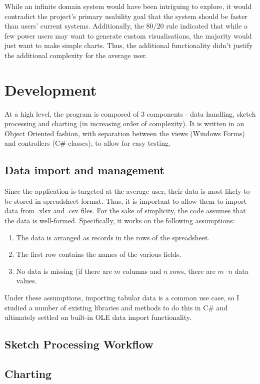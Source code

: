 	While an infinite domain system would have been intriguing to explore, it would contradict the project's primary usability goal that the system should be faster than users' current systems. Additionally, the 80/20 rule indicated that while a few power users may want to generate custom visualisations, the majority would just want to make simple charts. Thus, the additional functionality didn't justify the additional complexity for the average user.
	


	\section{Development}
		At a high level, the program is composed of 3 components - data handling, sketch processing and charting (in increasing order of complexity). It is written in an Object Oriented fashion, with separation between the views (Windows Forms) and controllers (C\# classes), to allow for easy testing.
	\subsection{Data import and management}
		Since the application is targeted at the average user, their data is most likely to be stored in spreadsheet format. Thus, it is important to allow them to import data from .xlsx and .csv files. 
		For the sake of simplicity, the code assumes that the data is well-formed. Specifically, it works on the following assumptions:
		\begin{enumerate}
		\item The data is arranged as records in the rows of the spreadsheet.
		\item The first row contains the names of the various fields.
		\item No data is missing (if there are $m$ columns and $n$ rows, there are $m \cdot n$ data values.
		\end{enumerate}
		
		Under these assumptions, importing tabular data is a common use case, so I studied a number of existing libraries and methods to do this in C\# and ultimately settled on built-in OLE data import functionality. 
	\subsection{Sketch Processing Workflow}
	\subsection{Charting}
	